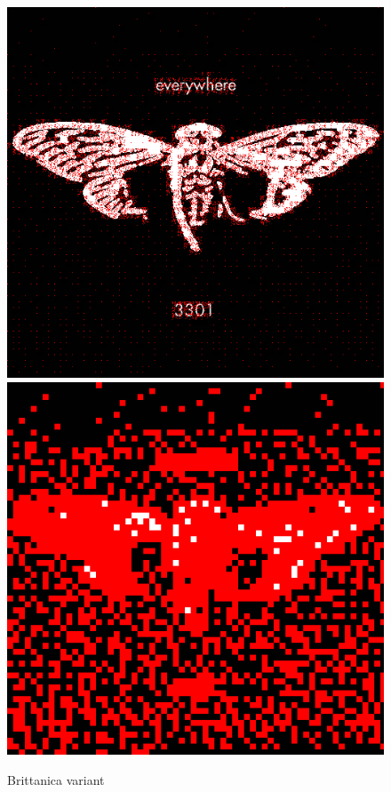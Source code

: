 \documentclass{article}
\begin{document}
\begin{figure}[h]
	\centering
	
	\includegraphics[scale=0.3]{brittanica_data_coefficients}
	\includegraphics[scale=0.3]{brittanica_data_blocks}
	
	\caption{Brittanica variant}
\end{figure}
\FloatBarrier
\end{document}
